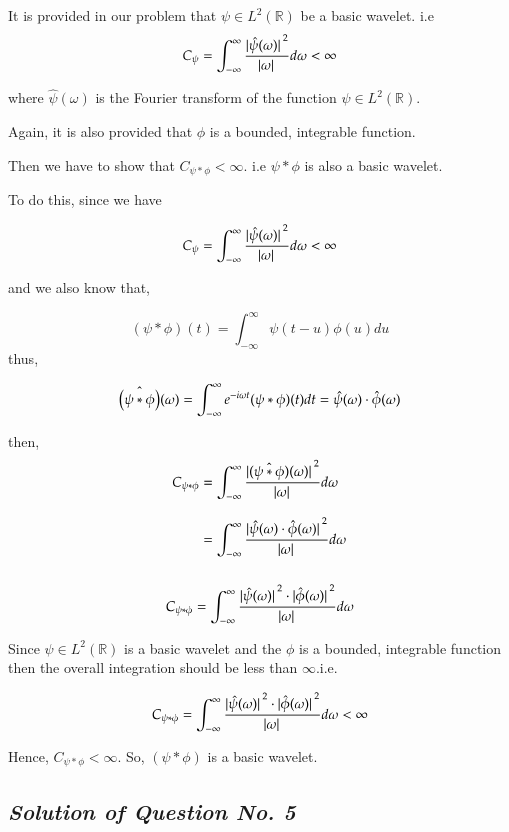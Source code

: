 \documentclass[12pt, a4paper]{article} %
\begin{document}
It is provided in our problem that $\psi\in L^2(\mathbb{R})$ be a basic wavelet. i.e
\[C_\psi = \int_{-\infty}^{\infty} \frac{\abs*{\hat{\psi}(\omega)}^2}{\abs*{\omega}}d\omega < \infty\]

where $\hat{\psi}(\omega)$ is the Fourier transform of the function $\psi\in L^2(\mathbb{R})$.

Again, it is also provided that $\phi$ is a bounded, integrable function.

Then we have to show that $C_{\psi \ast \phi} < \infty$. i.e $\psi \ast \phi$ is also a basic wavelet. 

To do this, since we have

\[C_\psi = \int_{-\infty}^{\infty} \frac{\abs*{\hat{\psi}(\omega)}^2}{\abs*{\omega}}d\omega < \infty\]

and we also know that,

\[(\psi \ast \phi)(t) = \int_{-\infty}^{\infty}\psi(t-u)\phi(u)du\]
thus,

\[\Hat{\left(\psi \ast \phi\right)}(\omega) = \int_{-\infty}^{\infty} e^{-i\omega t}(\psi \ast \phi)(t)dt = \hat{\psi}(\omega)\cdot\hat{\phi}(\omega)\]

then, 
\begin{equation*}
    \begin{split}
        C_{\psi \ast \phi} & = \int_{-\infty}^{\infty} \frac{\abs*{\Hat{(\psi\ast\phi)}(\omega)}^2}{\abs*{\omega}}d\omega\\[3mm]
        & = \int_{-\infty}^{\infty} \frac{\abs*{\Hat{\psi}(\omega)\cdot \hat{\phi}(\omega)}^2}{\abs*{\omega}}d\omega\\[3mm]
    \end{split}
\end{equation*}

\[C_{\psi \ast \phi}  = \int_{-\infty}^{\infty} \frac{\abs*{\Hat{\psi}(\omega)}^2\cdot \abs*{\hat{\phi}(\omega)}^2}{\abs*{\omega}}d\omega\]

Since $\psi\in L^2(\mathbb{R})$ is a basic wavelet and the $\phi$ is a bounded, integrable function then the overall integration should be less than $\infty$.i.e.


\[C_{\psi \ast \phi}  = \int_{-\infty}^{\infty} \frac{\abs*{\Hat{\psi}(\omega)}^2\cdot \abs*{\hat{\phi}(\omega)}^2}{\abs*{\omega}}d\omega < \infty\]

Hence, $C_{\psi\ast\phi} < \infty$.
So, $\left(\psi\ast\phi\right)$ is a basic wavelet.

\BgThispage
\subsection{\slshape Solution of Question No. 5}
\end{document}
